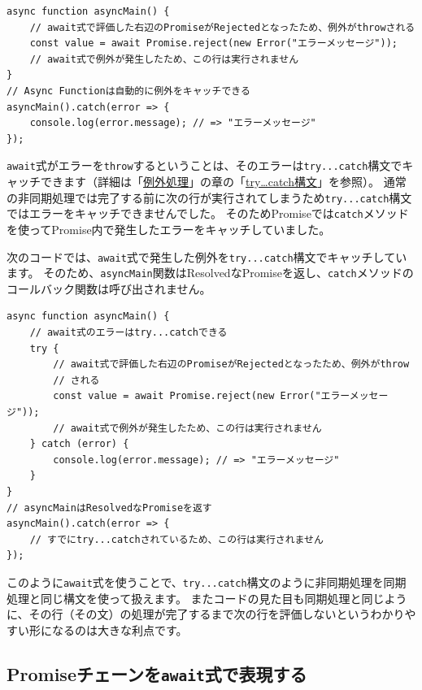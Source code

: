 \begin{lstlisting}
async function asyncMain() {
    // await式で評価した右辺のPromiseがRejectedとなったため、例外がthrowされる
    const value = await Promise.reject(new Error("エラーメッセージ"));
    // await式で例外が発生したため、この行は実行されません
}
// Async Functionは自動的に例外をキャッチできる
asyncMain().catch(error => {
    console.log(error.message); // => "エラーメッセージ"
});
\end{lstlisting}

\texttt{await}式がエラーを\texttt{throw}するということは、そのエラーは\texttt{try...catch}構文でキャッチできます（詳細は「\hyperlink{error-handling}{例外処理}」の章の「\hyperlink{try-catch}{try\ldots{}catch構文}」を参照）。
通常の非同期処理では完了する前に次の行が実行されてしまうため\texttt{try...catch}構文ではエラーをキャッチできませんでした。
そのためPromiseでは\texttt{catch}メソッドを使ってPromise内で発生したエラーをキャッチしていました。

次のコードでは、\texttt{await}式で発生した例外を\texttt{try...catch}構文でキャッチしています。
そのため、\texttt{asyncMain}関数はResolvedなPromiseを返し、\texttt{catch}メソッドのコールバック関数は呼び出されません。

\begin{lstlisting}
async function asyncMain() {
    // await式のエラーはtry...catchできる
    try {
        // await式で評価した右辺のPromiseがRejectedとなったため、例外がthrow
        // される
        const value = await Promise.reject(new Error("エラーメッセージ"));
        // await式で例外が発生したため、この行は実行されません
    } catch (error) {
        console.log(error.message); // => "エラーメッセージ"
    }
}
// asyncMainはResolvedなPromiseを返す
asyncMain().catch(error => {
    // すでにtry...catchされているため、この行は実行されません
});
\end{lstlisting}

このように\texttt{await}式を使うことで、\texttt{try...catch}構文のように非同期処理を同期処理と同じ構文を使って扱えます。
またコードの見た目も同期処理と同じように、その行（その文）の処理が完了するまで次の行を評価しないというわかりやすい形になるのは大きな利点です。

\hypertarget{promise-chain-to-async-function}{%
\subsection{\texorpdfstring{Promiseチェーンを\texttt{await}式で表現する}{Promiseチェーンをawait式で表現する}}\label{promise-chain-to-async-function}}

